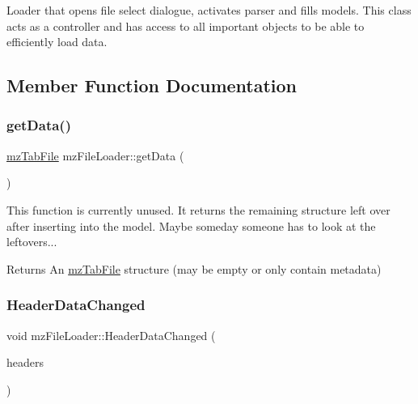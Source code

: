 Loader that opens file select dialogue, activates parser and fills models. This class acts as a controller and has access to all important objects to be able to efficiently load data. 

\subsection{Member Function Documentation}
\mbox{\label{classmz_file_loader_a495d5ddac38877451d24d974c25f7f11}} 
\subsubsection{\texorpdfstring{get\+Data()}{getData()}}
{\footnotesize\ttfamily \mbox{\hyperlink{structmz_tab_file}{mz\+Tab\+File}} mz\+File\+Loader\+::get\+Data (\begin{DoxyParamCaption}{ }\end{DoxyParamCaption})\hspace{0.3cm}{\ttfamily [inline]}}



This function is currently unused. It returns the remaining structure left over after inserting into the model. Maybe someday someone has to look at the leftovers... 

\begin{DoxyReturn}{Returns}
An \mbox{\hyperlink{structmz_tab_file}{mz\+Tab\+File}} structure (may be empty or only contain metadata) 
\end{DoxyReturn}
\mbox{\label{classmz_file_loader_ae659f02714e23607b981617155302f71}} 
\subsubsection{\texorpdfstring{Header\+Data\+Changed}{HeaderDataChanged}}
{\footnotesize\ttfamily void mz\+File\+Loader\+::\+Header\+Data\+Changed (\begin{DoxyParamCaption}\item[{Q\+String\+List}]{headers }\end{DoxyParamCaption})\hspace{0.3cm}{\ttfamily [signal]}}



